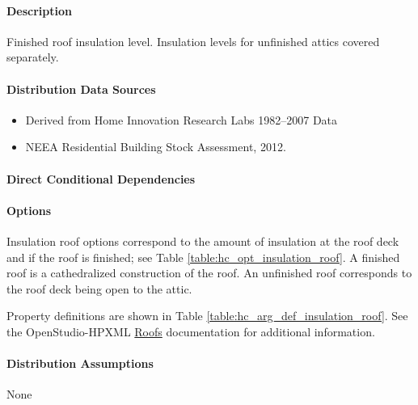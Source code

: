 \paragraph{Description}
% 
Finished roof insulation level. Insulation levels for unfinished attics covered separately.

\paragraph{Distribution Data Sources}
% 
\begin{itemize}
    \item
      Derived from Home Innovation Research Labs 1982--2007 Data
    \item
      NEEA Residential Building Stock Assessment, 2012.
\end{itemize}

\paragraph{Direct Conditional Dependencies}


\paragraph{Options}
Insulation roof options correspond to the amount of insulation at the roof deck and if the roof is finished; see Table \ref{table:hc_opt_insulation_roof}. A finished roof is a cathedralized construction of the roof. An unfinished roof corresponds to the roof deck being open to the attic.



Property definitions are shown in Table \ref{table:hc_arg_def_insulation_roof}. See the OpenStudio-HPXML \href{https://openstudio-hpxml.readthedocs.io/en/v1.10.0/workflow_inputs.html#hpxml-roofs}{Roofs} documentation for additional information.



\paragraph{Distribution Assumptions}
% 
None
